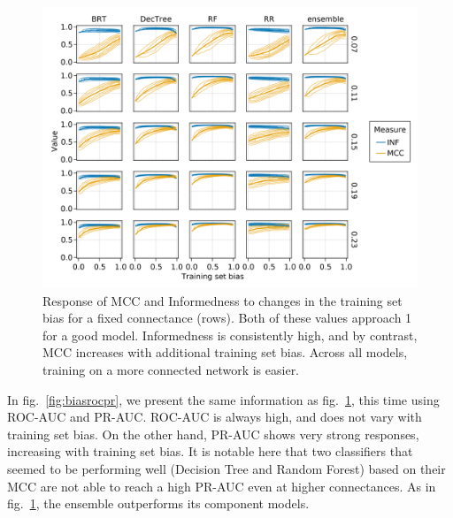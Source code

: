\documentclass[11pt]{article}
\makeatletter
\def\maxwidth{\ifdim\Gin@nat@width>\linewidth\linewidth
\else\Gin@nat@width\fi}
\let\Oldincludegraphics\includegraphics
\renewcommand{\includegraphics}[1]{\Oldincludegraphics[width=\maxwidth]{#1}}
\makeatother
\begin{document}
\begin{figure}
\hypertarget{fig:biasmccinf}{%
\centering
\includegraphics{figures/bias_mcc_inf.png}
\caption{Response of MCC and Informedness to changes in the training set
bias for a fixed connectance (rows). Both of these values approach 1 for
a good model. Informedness is consistently high, and by contrast, MCC
increases with additional training set bias. Across all models, training
on a more connected network is easier.}\label{fig:biasmccinf}
}
\end{figure}

In fig.~\ref{fig:biasrocpr}, we present the same information as
fig.~\ref{fig:biasmccinf}, this time using ROC-AUC and PR-AUC. ROC-AUC
is always high, and does not vary with training set bias. On the other
hand, PR-AUC shows very strong responses, increasing with training set
bias. It is notable here that two classifiers that seemed to be
performing well (Decision Tree and Random Forest) based on their MCC are
not able to reach a high PR-AUC even at higher connectances. As in
fig.~\ref{fig:biasmccinf}, the ensemble outperforms its component
models.
\end{document}

